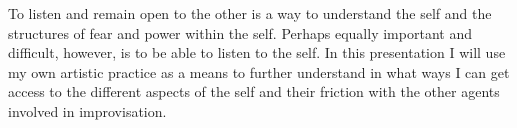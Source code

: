 \documentclass[a4paper]{article}
\begin{document}
To listen and remain open to the other is a way to understand the self and the structures of fear and power within the self. Perhaps equally important and difficult, however, is to be able to listen to the self. In this presentation I will use my own artistic practice as a means to further understand in what ways I can get access to the different aspects of the self and their friction with the other agents involved in improvisation.











\end{document}
